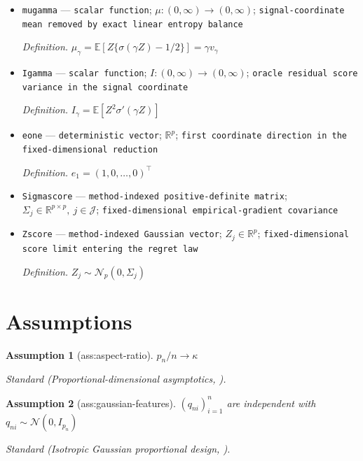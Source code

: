 \documentclass{article}
\newtheorem{assumption}{Assumption}
\begin{document}
\begin{itemize}
  \par\smallskip\noindent\emph{Definition.} \(p\in\mathbb N\)
  \item \texttt{mugamma} --- \texttt{scalar function}; \(\mu:(0,\infty)\to(0,\infty)\); \texttt{signal-\allowbreak{}coordinate mean removed by exact linear entropy balance}
  \par\smallskip\noindent\emph{Definition.} \(\mu_\gamma=\mathbb E[Z\{\sigma(\gamma Z)-1/2\}]=\gamma v_\gamma\)
  \item \texttt{Igamma} --- \texttt{scalar function}; \(I:(0,\infty)\to(0,\infty)\); \texttt{oracle residual score variance in the signal coordinate}
  \par\smallskip\noindent\emph{Definition.} \(I_\gamma=\mathbb E[Z^2\sigma'(\gamma Z)]\)
  \item \texttt{eone} --- \texttt{deterministic vector}; \(\mathbb R^p\); \texttt{first coordinate direction in the fixed-\allowbreak{}dimensional reduction}
  \par\smallskip\noindent\emph{Definition.} \(e_1=(1,0,\ldots,0)^\top\)
  \item \texttt{Sigmascore} --- \texttt{method-\allowbreak{}indexed positive-\allowbreak{}definite matrix}; \(\Sigma_j\in\mathbb R^{p\times p},\ j\in\mathcal J\); \texttt{fixed-\allowbreak{}dimensional empirical-\allowbreak{}gradient covariance}
  \item \texttt{Zscore} --- \texttt{method-\allowbreak{}indexed Gaussian vector}; \(Z_j\in\mathbb R^p\); \texttt{fixed-\allowbreak{}dimensional score limit entering the regret law}
  \par\smallskip\noindent\emph{Definition.} \(Z_j\sim\mathcal N_p(0,\Sigma_j)\)
\end{itemize}

\section{Assumptions}

\begin{assumption}[ass:aspect-ratio]\label{ass:aspect-ratio}
\(p_n/n\to\kappa\)
\par\smallskip\noindent\emph{Standard} (Proportional-dimensional asymptotics, \cite{SurCandes2019}).
\end{assumption}

\begin{assumption}[ass:gaussian-features]\label{ass:gaussian-features}
\((q_{ni})_{i=1}^{n}\) are independent with \(q_{ni}\sim\mathcal N(0,I_{p_n})\)
\par\smallskip\noindent\emph{Standard} (Isotropic Gaussian proportional design, \cite{SurCandes2019}).
\end{assumption}
\end{document}
